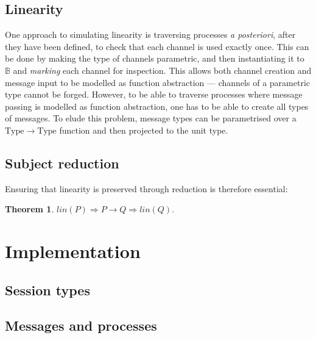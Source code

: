 \documentclass{mproj}
\newtheorem{theorem}{Theorem}
\begin{document}
\section{Linearity}\label{linearity}

One approach to simulating linearity is traversing processes \emph{a posteriori}, after they have been defined, to check that each channel is used exactly once. This can be done by making the type of channels parametric, and then instantiating it to $\mathbb{B}$ and \emph{marking} each channel for inspection. This allows both channel creation and message input to be modelled as function abstraction --- channels of a parametric type cannot be forged.  However, to be able to traverse processes where message passing is modelled as function abstraction, one has to be able to create all types of messages. To elude this problem, message types can be parametrised over a $\mathrm{Type} \rightarrow \mathrm{Type}$ function and then projected to the unit type.

\cite{Kobayashi1999}
\cite{Toninho2011}

    


\section{Subject reduction}\label{subject-reduction}

Ensuring that linearity is preserved through reduction is therefore essential:
\begin{theorem}
    $lin(P) \Rightarrow P \rightarrow Q \Rightarrow lin(Q).$
\end{theorem}

\chapter{Implementation}\label{implementation}

\section{Session types}

\section{Messages and processes}\label{processes}
\end{document}
